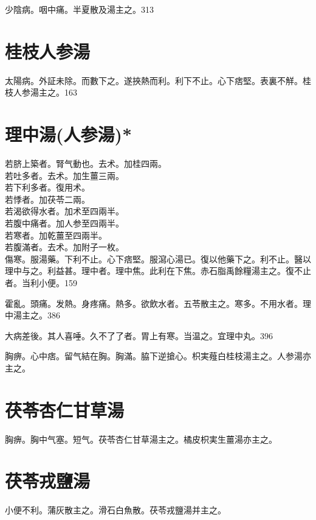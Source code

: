 \documentclass[12pt,twoside,UTF8,b5paper]{ctexbook}
\begin{document}
少陰病。咽中痛。半夏散及湯主之。313

\section{桂枝人参湯}

太陽病。外証未除。而數下之。遂挾熱而利。利下不止。心下痞堅。表裏不觧。桂枝人参湯主之。163

\section{理中湯(人参湯)*}

{若}脐上築者。腎气動也。去术。加桂四兩。\\
{若}吐多者。去术。加生薑三兩。\\
{若}下{利}多者。復用术。\\
{若}悸者。加茯苓二兩。\\
{若}渴{欲得水}者。加术至四兩半。\\
{若}腹中痛者。加人参至四兩半。\\
{若}寒者。加乾薑至四兩半。\\
{若}腹滿者。去术。加附子一枚。\\

傷寒。服湯藥。下利不止。心下痞堅。服瀉心湯已。復以他藥下之。利不止。醫以理中与之。利益甚。理中者。理中焦。此利在下焦。赤石脂禹餘糧湯主之。復不止者。当利小便。159

霍亂。頭痛。发熱。身疼痛。熱多。欲飲水者。五苓散主之。寒多。不用水者。理中湯主之。386

大病差後。其人喜唾。久不了了者。胃上有寒。当温之。宜理中丸。396

胸痹。心中痞。留气結在胸。胸滿。脇下逆搶心。枳実薤白桂枝湯主之。人参湯亦主之。

\section{茯苓杏仁甘草湯}

胸痹。胸中气塞。短气。茯苓杏仁甘草湯主之。橘{皮}枳{実生}薑湯亦主之。

\section{茯苓戎鹽湯}

小便不利。蒲灰散主之。滑石白魚散。茯苓戎鹽湯并主之。
\end{document}
